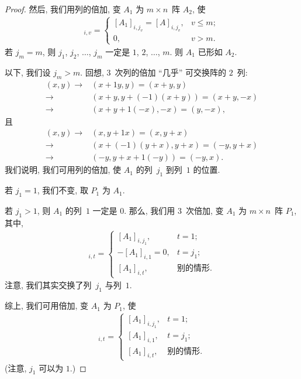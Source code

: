 \documentclass[../libro.tex]{subfiles}
\begin{document}
\begin{proof}
    然后, 我们用列的倍加, 变 \(A_1\) 为
    \(m \times n\)~阵 \(A_2\),
    使
    \begin{align*}
        [A_2]_{i,v} =
        \begin{cases}
            [A_1]_{i,j_v} = [A]_{i,j_v}, & v \leq m; \\
            0,                           & v > m.
        \end{cases}
    \end{align*}
    若 \(j_m = m\),
    则 \(j_1\), \(j_2\), \(\dots\), \(j_m\)
    一定是 \(1\), \(2\), \(\dots\), \(m\).
    则 \(A_1\) 已形如 \(A_2\).

    以下, 我们设 \(j_m > m\).
    回想, \(3\)~次列的倍加 ``几乎'' 可交换阵的 \(2\)~列:
    \begin{align*}
        (x, y)
        \to {} & (x + 1y, y) = (x + y, y)                \\
        \to {} & (x + y, y + (-1) (x + y)) = (x + y, -x) \\
        \to {} & (x + y + 1(-x), -x) = (y, -x),
    \end{align*}
    且
    \begin{align*}
        (x, y)
        \to {} & (x, y + 1x) = (x, y + x)               \\
        \to {} & (x + (-1)(y + x), y + x) = (-y, y + x) \\
        \to {} & (-y, y + x + 1(-y)) = (-y, x).
    \end{align*}
    我们说明,
    我们可用列的倍加,
    使 \(A_1\) 的列~\(j_1\) 到列~\(1\) 的位置.

    若 \(j_1 = 1\), 我们不变, 取 \(P_1\) 为 \(A_1\).

    若 \(j_1 > 1\), 则 \(A_1\) 的列~\(1\) 一定是 \(0\).
    那么, 我们用 \(3\)~次倍加, 变 \(A_1\) 为
    \(m \times n\)~阵 \(P_1\),
    其中,
    \begin{align*}
        [P_1]_{i,t} =
        \begin{cases}
            [A_1]_{i,j_1},    & t = 1;       \\
            -[A_1]_{i,1} = 0, & t = j_1;     \\
            [A_1]_{i,t},      & \text{别的情形}.
        \end{cases}
    \end{align*}
    注意, 我们其实交换了列~\(j_1\) 与列~\(1\).

    综上, 我们可用倍加,
    变 \(A_1\) 为 \(P_1\),
    使
    \begin{align*}
        [P_1]_{i,t} =
        \begin{cases}
            [A_1]_{i,j_1}, & t = 1;       \\
            [A_1]_{i,1},   & t = j_1;     \\
            [A_1]_{i,t},   & \text{别的情形}.
        \end{cases}
    \end{align*}
    (注意, \(j_1\) 可以为 \(1\).)


\end{proof}
\end{document}
